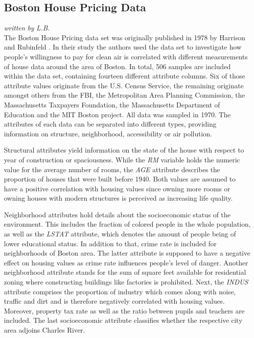 \subsection{Boston House Pricing Data}
\textit{written by L.B.}\\

The Boston House Pricing data set was originally published in 1978 by Harrison and Rubinfeld \cite{hedonichousepricing}. In their study the authors used the data set to investigate how people's willingness to pay for clean air is correlated with different measurements of house data around the area of Boston.
In total, 506 samples are included within the data set, containing fourteen different attribute columns. Six of those attribute values originate from the U.S. Census Service, the remaining originate amongst others from the FBI, the Metropolitan Area Planning Commission, the Massachusetts Taxpayers Foundation, the Massachusetts Department of Education and the MIT Boston project. All data was sampled in 1970. The attributes of each data can be separated into different types, providing information on structure, neighborhood, accessibility or air pollution.

Structural attributes yield information on the state of the house with respect to year of construction or spaciousness. While the \textit{RM} variable holds the numeric value for the average number of rooms, the \textit{AGE} attribute describes the proportion of houses that were built before 1940. Both values are assumed to have a positive correlation with housing values since owning more rooms or owning houses with modern structures is perceived as increasing life quality. 

Neighborhood attributes hold details about the socioeconomic status of the environment. This includes the fraction of colored people in the whole population, as well as the \textit{LSTAT} attribute, which denotes the amount of people being of lower educational status. In addition to that, crime rate is included for neighborhoods of Boston area. The latter attribute is supposed to have a negative effect on housing values as crime rate influences people's level of danger. 
Another neighborhood attribute stands for the sum of square feet available for residential zoning where constructing buildings like factories is prohibited. Next, the \textit{INDUS} attribute comprises the proportion of industry which comes along with noise, traffic and dirt and is therefore negatively correlated with housing values. Moreover, property tax rate as well as the ratio between pupils and teachers are included. The last socioeconomic attribute classifies whether the respective city area adjoins Charles River.

